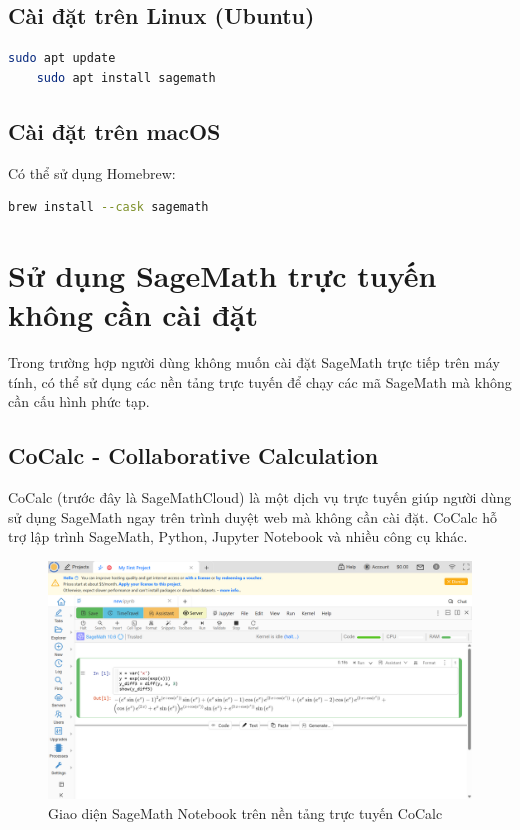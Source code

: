 \subsection*{Cài đặt trên Linux (Ubuntu)}

\begin{lstlisting}[language=bash]
	sudo apt update
	sudo apt install sagemath
\end{lstlisting}

\subsection*{Cài đặt trên macOS}

Có thể sử dụng Homebrew:

\begin{lstlisting}[language=bash]
	brew install --cask sagemath
\end{lstlisting}

\section{Sử dụng SageMath trực tuyến không cần cài đặt}

Trong trường hợp người dùng không muốn cài đặt SageMath trực tiếp trên máy tính, có thể sử dụng các nền tảng trực tuyến để chạy các mã SageMath mà không cần cấu hình phức tạp.

\subsection{CoCalc - Collaborative Calculation}

CoCalc (trước đây là SageMathCloud) là một dịch vụ trực tuyến giúp người dùng sử dụng SageMath ngay trên trình duyệt web mà không cần cài đặt. CoCalc hỗ trợ lập trình SageMath, Python, Jupyter Notebook và nhiều công cụ khác.
\begin{figure}[H]
	\centering
	\includegraphics[width=0.7\linewidth]{images/screenshot004}
	\caption{Giao diện SageMath Notebook trên nền tảng trực tuyến CoCalc}
	\label{fig:screenshot004}
\end{figure}

